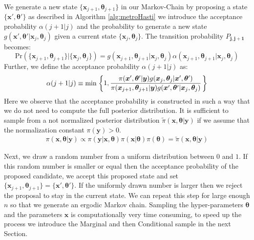 We generate a new state $\{ \bm{x}_{j+1}, \bm{\theta}_{j+1} \} $ in our Markov-Chain by proposing a state $ \{ \bm{x}', \bm{\theta}' \}$ as described in Algorithm \ref{alg:metroHasti} we introduce the acceptance probability $\alpha(j+1|j)$ and the probability to generate a new state $g(\bm{x}', \bm{\theta}'|\bm{x}_{j}, \bm{\theta}_{j})$ given a current state $\{ \bm{x}_{j}, \bm{\theta}_{j}\}$.
The transition probability $P_{\bm{j,j+1}}$ becomes:
\begin{equation}
    \text{Pr}(\{ \bm{x}_{j+1}, \bm{\theta}_{j+1} \} | \{ \bm{x}_j, \bm{\theta}_j \}) = g(\bm{x}_{j+1}, \bm{\theta}_{j+1} | \bm{x}_j, \bm{\theta}_j) \alpha(\bm{x}_{j+1}, \bm{\theta}_{j+1}|\bm{x}_j, \bm{\theta}_j)
\end{equation}
Further, we define the acceptance probability $\alpha(j+1|j)$ as:
\begin{align}
    \alpha(j+1|j) \equiv \min 
    \begin{rcases}
        \begin{dcases}
            1, \frac{\pi( \bm{x}', \bm{\theta}' | \bm{y}) g(\bm{x}_j, \bm{\theta}_j|\bm{x}', \bm{\theta}' )}{\pi( \bm{x}_{j+1}, \bm{\theta}_{j+1}| \bm{y}) g(\bm{x}', \bm{\theta}'|\bm{x}_j, \bm{\theta}_j )}
        \end{dcases}
    \end{rcases}
\end{align}
Here we observe that the acceptance probability is constructed in such a way that we do not need to compute the full posterior distribution.
It is sufficient to sample from a not normalized posterior distribution $\tilde{\pi}(\bm{x} , \bm{\theta} | \bm{y})$ if we assume that the normalization constant $\pi(\bm{y}) > 0$.
\begin{align}
    \pi (\bm{x} , \bm{\theta} | \bm{y}) \propto \pi( \bm{y} | \bm{x}, \bm{\theta} )  \pi(\bm{x} |  \bm{\theta}) \pi( \bm{\theta} ) = \tilde{\pi} (\bm{x} , \bm{\theta} | \bm{y})
\end{align}

Next, we draw a random number from a uniform distribution between $0$ and $1$.
If this random number is smaller or equal then the acceptance probability of the proposed candidate, we accept this proposed state and set $\{ \bm{x}_{j+1}, \bm{\theta}_{j+1} \} = \{ \bm{x}', \bm{\theta}' \} $.
If the uniformly drawn number is larger then we reject the proposal to stay in the current state.
We can repeat this step for large enough $n$ so that we generate an ergodic Markov chain.
Sampling the hyper-parameters $\bm{\theta}$ and the parameters $\bm{x}$ is computationally very time consuming, to speed up the process we introduce the Marginal and then Conditional sample in the next Section.

